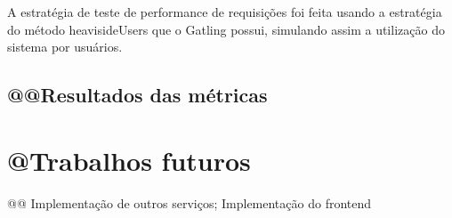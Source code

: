 A estratégia de teste de performance de requisições foi feita usando a
estratégia do método heavisideUsers \cite{gatling-simulation-setup}
que o Gatling possui, simulando assim a utilização do sistema por usuários.

\subsection{@@Resultados das métricas}



\section{@Trabalhos futuros}\label{trabalhos-futuros}

@@ Implementação de outros serviços; Implementação do frontend

